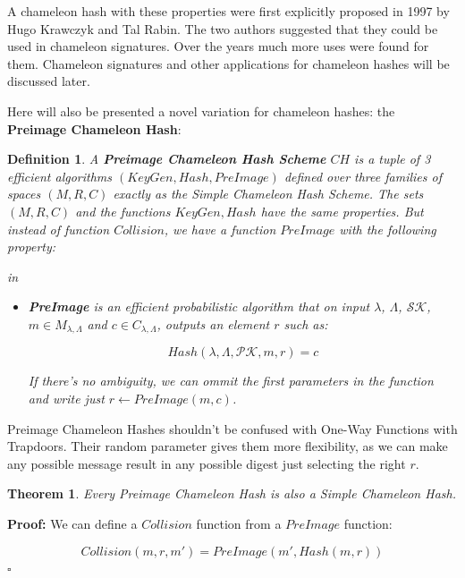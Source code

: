 \documentclass[a4paper]{article}
\newtheorem{definicao}{Definition}
\newtheorem{theorem}{Theorem}
\newcommand*{\qed}{\hfill\ensuremath{\square}}
\begin{document}
    A chameleon hash with these properties were first explicitly 
    proposed in 1997 by Hugo Krawczyk and Tal Rabin. The two authors 
    suggested that they could be used in chameleon signatures. Over the
    years much more uses were found for them. Chameleon signatures
    and other applications for chameleon hashes will be discussed later.
    
    Here will also be presented a novel variation for chameleon hashes:
    the \textbf{Preimage Chameleon Hash}:
    
    \begin{definicao}
    A \textbf{Preimage Chameleon Hash Scheme} $CH$ is a tuple of 3
    efficient algorithms $(KeyGen, Hash, PreImage)$ defined over
    three families of spaces $(M, R, C)$ exactly as the Simple 
    Chameleon Hash Scheme. The sets $(M, R, C)$ and the functions
    $KeyGen, Hash$ have the same properties. But instead of function
    $Collision$, we have a function $PreImage$ with the following property:
    
    in\begin{itemize}
        \item\textbf{PreImage} is an efficient probabilistic algorithm
        that on input $\lambda$, $\Lambda$, $\mathcal{SK}$,
        $m \in M_{\lambda,\Lambda}$ and $c \in C_{\lambda,\Lambda}$,
        outputs an element $r$ such as:
        
        $$
        Hash(\lambda, \Lambda, \mathcal{PK}, m, r)= c
        $$
        
        If there's no ambiguity, we can ommit the first parameters in the
        function and write just $r \leftarrow PreImage(m, c)$.
    \end{itemize}
    \end{definicao}
    
    Preimage Chameleon Hashes shouldn't be confused with One-Way Functions
    with Trapdoors. Their random parameter gives them more flexibility,
    as we can make any possible message result in any possible digest
    just selecting the right $r$.
    
    \begin{theorem}
    Every Preimage Chameleon Hash is also a Simple Chameleon Hash.
    \end{theorem}
    
    \textbf{Proof: }We can define a $Collision$ function from a
    $PreImage$ function:
    
    $$
    Collision(m, r, m') = PreImage(m', Hash(m, r))
    $$\qed
    
\end{document}
